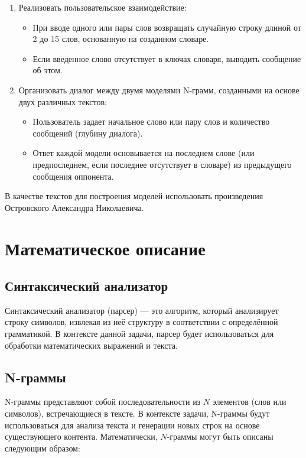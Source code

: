 \documentclass[a4paper, final]{article}
\begin{document}
\begin{enumerate}
\begin{enumerate}
		\item Реализовать пользовательское взаимодействие:
		\begin{itemize}
			\item При вводе одного или пары слов возвращать случайную строку длиной от 2 до 15 слов, основанную на созданном словаре.
			\item Если введенное слово отсутствует в ключах словаря, выводить сообщение об этом.
		\end{itemize}
		
		\item Организовать диалог между двумя моделями N-грамм, созданными на основе двух различных текстов:
		\begin{itemize}
			\item Пользователь задает начальное слово или пару слов и количество сообщений (глубину диалога).
			\item Ответ каждой модели основывается на последнем слове (или предпоследнем, если последнее отсутствует в словаре) из предыдущего сообщения оппонента.
		\end{itemize}
	\end{enumerate}
	
	В качестве текстов для построения моделей использовать произведения Островского Александра Николаевича.
\end{enumerate}


\newpage
\section {Математическое описание}

\subsection{Синтаксический анализатор}

Синтаксический анализатор (парсер) — это алгоритм, который анализирует строку символов, извлекая из неё структуру в соответствии с определённой грамматикой. В контексте данной задачи, парсер будет использоваться для обработки математических выражений и текста.

\subsection{N-граммы}

N-граммы представляют собой последовательности из \(N\) элементов (слов или символов), встречающиеся в тексте. В контексте задачи, N-граммы будут использоваться для анализа текста и генерации новых строк на основе существующего контента. Математически, \(N\)-граммы могут быть описаны следующим образом:
\end{document}
